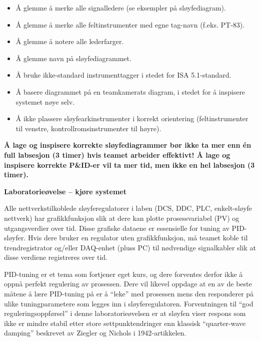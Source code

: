 \begin{itemize}
\item{} Å glemme å merke alle signalledere (se eksempler på sløyfediagram).
\item{} Å glemme å merke alle feltinstrumenter med egne tag-navn (f.eks. PT-83).
\item{} Å glemme å notere alle lederfarger.
\item{} Å glemme navn på sløyfediagrammet.
\item{} Å bruke ikke-standard instrumenttagger i stedet for ISA 5.1-standard.
\item{} Å basere diagrammet på en teamkamerats diagram, i stedet for å inspisere systemet nøye selv.
\item{} Å ikke plassere sløyfearkinstrumenter i korrekt orientering (feltinstrumenter til venstre, kontrollromsinstrumenter til høyre).
\end{itemize}

\vskip 10pt

{\bf Å lage og inspisere korrekte sløyfediagrammer bør ikke ta mer enn én full labsesjon (3 timer) hvis teamet arbeider effektivt! Å lage og inspisere korrekte P\&ID-er vil ta mer tid, men ikke en hel labsesjon (3 timer).}





\vfil \eject

\noindent
{\bf Laboratorieøvelse -- kjøre systemet}

\vskip 5pt

Alle nettverkstilkoblede sløyferegulatorer i laben (DCS, DDC, PLC, enkelt-sløyfe nettverk) har grafikkfunksjon slik at dere kan plotte prosessvariabel (PV) og utgangsverdier over tid. Disse grafiske dataene er essensielle for tuning av PID-sløyfer. Hvis dere bruker en regulator uten grafikkfunksjon, må teamet koble til trendregistrator og/eller DAQ-enhet (pluss PC) til nødvendige signalkabler slik at disse verdiene registreres over tid.

PID-tuning er et tema som fortjener eget kurs, og dere forventes derfor ikke å oppnå perfekt regulering av prosessen. Dere vil likevel oppdage at en av de beste måtene å lære PID-tuning på er å ``leke'' med prosessen mens den responderer på ulike tuningparametere som legges inn i sløyferegulatoren. Forventningen til ``god reguleringsoppførsel'' i denne laboratorieøvelsen er at sløyfen viser respons som ikke er mindre stabil etter store settpunktendringer enn klassisk ``quarter-wave damping'' beskrevet av Ziegler og Nichols i 1942-artikkelen.

